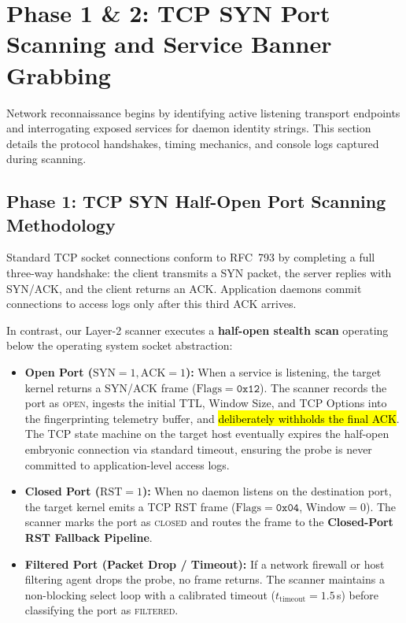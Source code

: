 \section{Phase 1 \& 2: TCP SYN Port Scanning and Service Banner Grabbing}\label{sec:scan_banner}

Network reconnaissance begins by identifying active listening transport endpoints and interrogating
exposed services for daemon identity strings. This section details the protocol handshakes, timing
mechanics, and console logs captured during scanning.

\subsection{Phase 1: TCP SYN Half-Open Port Scanning Methodology}
Standard TCP socket connections conform to RFC~793 by completing a full three-way handshake:
the client transmits a SYN packet, the server replies with SYN/ACK, and the client returns an ACK.
Application daemons commit connections to access logs only after this third ACK arrives.

In contrast, our Layer-2 scanner executes a \textbf{half-open stealth scan} operating below the
operating system socket abstraction:
\begin{itemize}
    \item \textbf{Open Port ($\text{SYN}=1, \text{ACK}=1$):} When a service is listening, the target
    kernel returns a SYN/ACK frame ($\text{Flags} = \mathtt{0x12}$). The scanner records the port as
    \textsc{open}, ingests the initial TTL, Window Size, and TCP Options into the fingerprinting
    telemetry buffer, and \hl{deliberately withholds the final ACK}. The TCP state machine on the
    target host eventually expires the half-open embryonic connection via standard timeout, ensuring
    the probe is never committed to application-level access logs.
    \item \textbf{Closed Port ($\text{RST}=1$):} When no daemon listens on the destination port, the
    target kernel emits a TCP RST frame ($\text{Flags} = \mathtt{0x04}$, Window$=0$). The scanner
    marks the port as \textsc{closed} and routes the frame to the \textbf{Closed-Port RST Fallback
    Pipeline}.
    \item \textbf{Filtered Port (Packet Drop / Timeout):} If a network firewall or host filtering
    agent drops the probe, no frame returns. The scanner maintains a non-blocking select loop with a
    calibrated timeout ($t_{\text{timeout}} = 1.5$\,s) before classifying the port as \textsc{filtered}.
\end{itemize}

